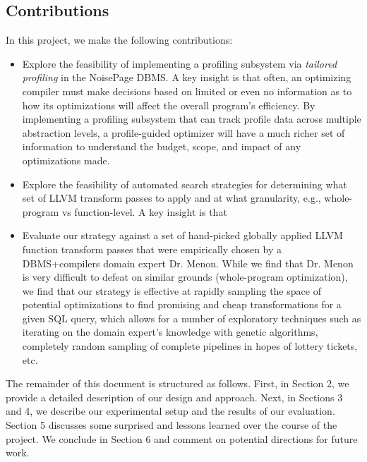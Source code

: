 \documentclass{vldb}
\begin{document}
\subsection{Contributions}

In this project, we make the following contributions:

\begin{itemize}
    \item Explore the feasibility of implementing a profiling subsystem via \textit{tailored profiling} \cite{beischl21} in the NoisePage DBMS. A key insight is that often, an optimizing compiler must make decisions based on limited or even no information as to how its optimizations will affect the overall program’s efficiency. By implementing a profiling subsystem that can track profile data across multiple abstraction levels, a profile-guided optimizer will have a much richer set of information to understand the budget, scope, and impact of any optimizations made. 
    \item Explore the feasibility of automated search strategies for determining what set of LLVM transform passes to apply and at what granularity, e.g., whole-program vs function-level. A key insight is that 
    \item Evaluate our strategy against a set of hand-picked globally applied LLVM function transform passes that were empirically chosen by a DBMS+compilers domain expert Dr. Menon. While we find that Dr. Menon is very difficult to defeat on similar grounds (whole-program optimization), we find that our strategy is effective at rapidly sampling the space of potential optimizations to find promising and cheap transformations for a given SQL query, which allows for a number of exploratory techniques such as iterating on the domain expert's knowledge with genetic algorithms, completely random sampling of complete pipelines in hopes of lottery tickets, etc.
\end{itemize}

The remainder of this document is structured as follows. First, in Section 2, we provide a detailed description of our design and approach. Next, in Sections 3 and 4, we describe our experimental setup and the results of our evaluation. Section 5 discusses some surprised and lessons learned over the course of the project. We conclude in Section 6 and comment on potential directions for future work.

\end{document}
